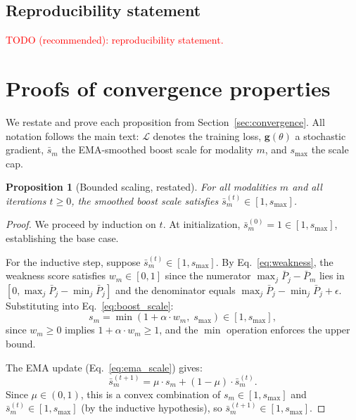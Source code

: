 \documentclass{article} %
\newtheorem{proposition}{Proposition}
\newcommand{\loss}{\mathcal{L}}
\begin{document}
\subsection*{Reproducibility statement}
\textcolor{red}{TODO (recommended): reproducibility statement.}






\clearpage
\appendix

\section{Proofs of convergence properties}
\label{app:proofs}

We restate and prove each proposition from Section~\ref{sec:convergence}. All notation follows the main text: $\loss$ denotes the training loss, $\mathbf{g}(\theta)$ a stochastic gradient, $\bar{s}_m$ the EMA-smoothed boost scale for modality $m$, and $s_{\max}$ the scale cap.

\begin{proposition}[Bounded scaling, restated]
For all modalities $m$ and all iterations $t \geq 0$, the smoothed boost scale satisfies $\bar{s}_m^{(t)} \in [1, s_{\max}]$.
\end{proposition}

\begin{proof}
We proceed by induction on $t$. At initialization, $\bar{s}_m^{(0)} = 1 \in [1, s_{\max}]$, establishing the base case.

For the inductive step, suppose $\bar{s}_m^{(t)} \in [1, s_{\max}]$. By Eq.~\eqref{eq:weakness}, the weakness score satisfies $w_m \in [0, 1]$ since the numerator $\max_j \bar{P}_j - \bar{P}_m$ lies in $[0, \max_j \bar{P}_j - \min_j \bar{P}_j]$ and the denominator equals $\max_j \bar{P}_j - \min_j \bar{P}_j + \epsilon$. Substituting into Eq.~\eqref{eq:boost_scale}:
%
\begin{equation*}
s_m = \min(1 + \alpha \cdot w_m,\; s_{\max}) \in [1, s_{\max}],
\end{equation*}
%
since $w_m \geq 0$ implies $1 + \alpha \cdot w_m \geq 1$, and the $\min$ operation enforces the upper bound.

The EMA update (Eq.~\eqref{eq:ema_scale}) gives:
%
\begin{equation*}
\bar{s}_m^{(t+1)} = \mu \cdot s_m + (1 - \mu) \cdot \bar{s}_m^{(t)}.
\end{equation*}
%
Since $\mu \in (0, 1)$, this is a convex combination of $s_m \in [1, s_{\max}]$ and $\bar{s}_m^{(t)} \in [1, s_{\max}]$ (by the inductive hypothesis), so $\bar{s}_m^{(t+1)} \in [1, s_{\max}]$.
\end{proof}
\end{document}
